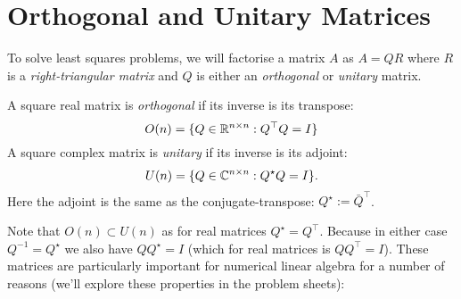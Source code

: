 
\section{Orthogonal and Unitary Matrices}
To solve least squares problems, we will  factorise a matrix $A$ as $A = QR$ where $R$ is a \emph{right-triangular matrix} and $Q$ is either an \emph{orthogonal} or \emph{unitary} matrix.

\begin{definition} A square real matrix is \emph{orthogonal} if its inverse is its transpose:
\[
O(n) = \{Q \in {\mathbb R}^{n \times n} : Q^\top Q = I \}
\]
A square complex matrix is \emph{unitary} if its inverse is its adjoint:
\[
U(n) = \{Q \in {\mathbb C}^{n \times n} : Q^\star Q = I \}.
\]
Here the adjoint is the same as the conjugate-transpose: $Q^\ensuremath{\star} := \bar Q^\ensuremath{\top}$.  \end{definition}

Note that $O(n) \ensuremath{\subset} U(n)$ as for real matrices $Q^\ensuremath{\star} = Q^\ensuremath{\top}$. Because in either case $Q^{-1} = Q^\ensuremath{\star}$ we also have $Q Q^\ensuremath{\star} = I$ (which for real matrices is $Q Q^\ensuremath{\top} = I$). These matrices are particularly important for numerical linear algebra for a number of reasons (we'll explore these properties in the problem sheets):


